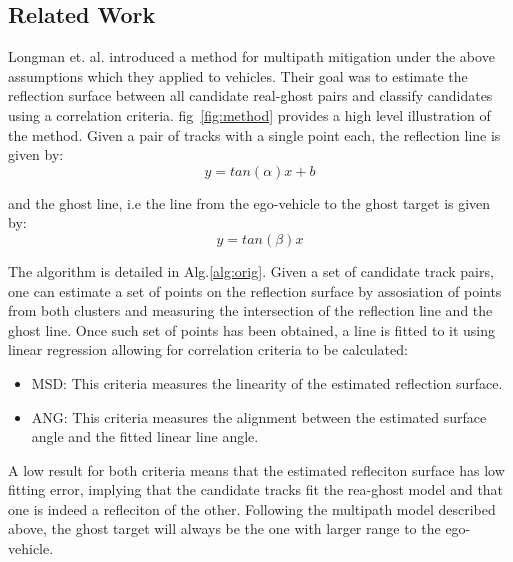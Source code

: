 \documentclass[../main.tex]{subfiles}
\begin{document}
\subsection{Related Work}
Longman et. al. \cite{longman_multipath_2021} introduced a method for multipath mitigation under the above assumptions which they applied to vehicles. Their goal was to estimate the reflection surface between all candidate real-ghost pairs and classify candidates using a correlation criteria.
fig~\ref{fig:method} provides a high level illustration of the method. Given a pair of tracks with a single point each, the reflection line is given by:
\begin{equation}
    y = tan(\alpha) x + b
\end{equation}

and the ghost line, i.e the line from the ego-vehicle to the ghost target is given by:
\begin{equation}
    y = tan(\beta) x
\end{equation}

\par
The algorithm is detailed in Alg.\ref{alg:orig}. Given a set of candidate track pairs, one can estimate a set of points on the reflection surface by assosiation of points from both clusters and measuring the intersection of the reflection line and the ghost line. Once such set of points has been obtained, a line is fitted to it using linear regression allowing for correlation criteria to be calculated:
\begin{itemize}
    \item MSD: This criteria measures the linearity of the estimated reflection surface.
    \item ANG: This criteria measures the alignment between the estimated surface angle and the fitted linear line angle.
\end{itemize}

\par
A low result for both criteria means that the estimated refleciton surface has low fitting error, implying that the candidate tracks fit the rea-ghost model and that one is indeed a refleciton of the other. Following the multipath model described above, the ghost target will always be the one with larger range to the ego-vehicle.
\end{document}
